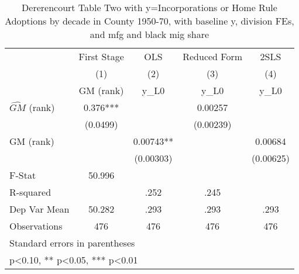 \begin{table}[htbp]\centering
\def\sym#1{\ifmmode^{#1}\else\(^{#1}\)\fi}
\caption{Dererencourt Table Two with y=Incorporations or Home Rule Adoptions by decade in County 1950-70, with baseline y, division FEs, and mfg and black mig share}
\begin{tabular}{l*{4}{c}}
\toprule
                    & First Stage   &         OLS   &Reduced Form   &        2SLS   \\
                    &\multicolumn{1}{c}{(1)}&\multicolumn{1}{c}{(2)}&\multicolumn{1}{c}{(3)}&\multicolumn{1}{c}{(4)}\\
                    &\multicolumn{1}{c}{GM  (rank)}&\multicolumn{1}{c}{y\_L0}&\multicolumn{1}{c}{y\_L0}&\multicolumn{1}{c}{y\_L0}\\
\midrule
$\hat{GM}$ (rank)   &       0.376***&               &     0.00257   &               \\
                    &    (0.0499)   &               &   (0.00239)   &               \\
\addlinespace
GM  (rank)          &               &     0.00743** &               &     0.00684   \\
                    &               &   (0.00303)   &               &   (0.00625)   \\
\midrule
F-Stat              &      50.996   &               &               &               \\
R-squared           &               &        .252   &        .245   &               \\
Dep Var Mean        &      50.282   &        .293   &        .293   &        .293   \\
Observations        &         476   &         476   &         476   &         476   \\
\bottomrule
\multicolumn{5}{l}{\footnotesize Standard errors in parentheses}\\
\multicolumn{5}{l}{\footnotesize * p<0.10, ** p<0.05, *** p<0.01}\\
\end{tabular}
\end{table}
